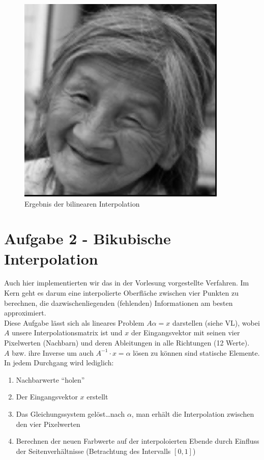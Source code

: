 \begin{figure}[H]
\begin{center}
\includegraphics[width=100mm]{u07/task1.eps}
\end{center}
\caption{Ergebnis der bilinearen Interpolation}
\end{figure}

\section*{Aufgabe 2 - Bikubische Interpolation}
Auch hier implementierten wir das in der Vorlesung vorgestellte Verfahren. 
Im Kern geht es darum eine interpolierte Oberfl\"ache zwischen vier Punkten
zu berechnen, die dazwischenliegenden (fehlenden) Informationen am besten 
approximiert.\\
Diese Aufgabe l\"asst sich als lineares Problem $A\alpha=x$ darstellen (siehe VL),
wobei $A$ unsere Interpolationsmatrix ist und $x$ der Eingangsvektor mit seinen vier
Pixelwerten (Nachbarn) und deren Ableitungen in alle Richtungen (12 Werte).\\
$A$ bzw. ihre Inverse um auch $A^{-1}\cdot x = \alpha$ l\"osen zu k\"onnen
sind statische Elemente. In jedem Durchgang wird lediglich:

\begin{enumerate}
\item Nachbarwerte ``holen''
\item Der Eingangsvektor $x$ erstellt
\item Das Gleichungssystem gel\"ost\ldots nach $\alpha$, man erh\"alt die 
      Interpolation zwischen den vier Pixelwerten
\item Berechnen der neuen Farbwerte auf der interpoloierten Ebende durch 
      Einfluss der Seitenverh\"altnisse (Betrachtung des Intervalls $[0,1]$)
\end{enumerate}

